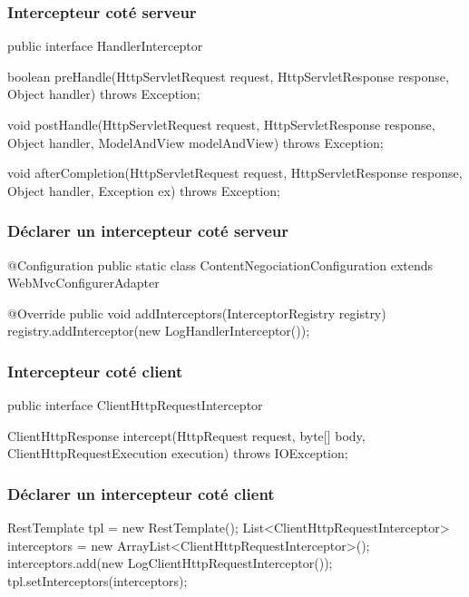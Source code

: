 \begin{frame}[fragile]
 \frametitle{Intercepteur coté serveur}

 \begin{javacode}
public interface HandlerInterceptor {

  boolean preHandle(HttpServletRequest request,
                    HttpServletResponse response,
                    Object handler) throws Exception;

  void postHandle(HttpServletRequest request,
                  HttpServletResponse response,
                  Object handler, ModelAndView modelAndView)
             throws Exception;

  void afterCompletion(HttpServletRequest request,
                       HttpServletResponse response,
                       Object handler, Exception ex)
             throws Exception;

}
 \end{javacode}

\end{frame}

\begin{frame}[fragile]
 \frametitle{Déclarer un intercepteur coté serveur}

 \begin{javacode}
@Configuration
public static class ContentNegociationConfiguration
              extends WebMvcConfigurerAdapter {

  @Override
  public void addInterceptors(InterceptorRegistry registry) {
    registry.addInterceptor(new LogHandlerInterceptor());
  }

}
 \end{javacode}

\end{frame}

\begin{frame}[fragile]
 \frametitle{Intercepteur coté client}

 \begin{javacode}
public interface ClientHttpRequestInterceptor {

  ClientHttpResponse intercept(HttpRequest request, byte[] body,
                               ClientHttpRequestExecution execution)
                       throws IOException;

}
 \end{javacode}

\end{frame}

\begin{frame}[fragile]
 \frametitle{Déclarer un intercepteur coté client}

 \begin{javacode}
RestTemplate tpl = new RestTemplate();
List<ClientHttpRequestInterceptor> interceptors =
  new ArrayList<ClientHttpRequestInterceptor>();
interceptors.add(new LogClientHttpRequestInterceptor());
tpl.setInterceptors(interceptors);
 \end{javacode}

\end{frame}
